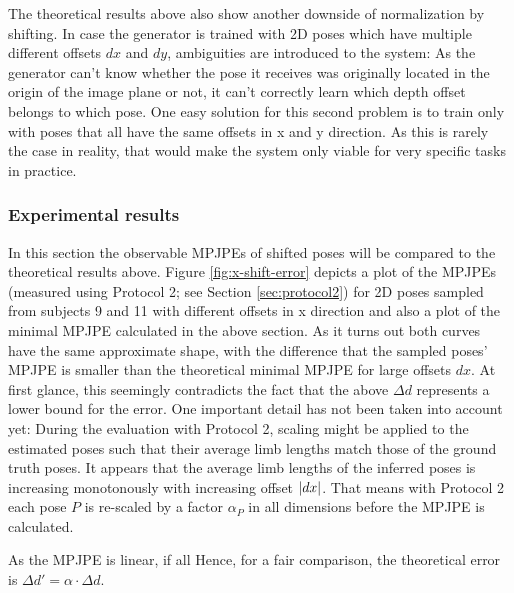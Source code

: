 The theoretical results above also show another downside of normalization by shifting.
In case the generator is trained with 2D poses which have multiple different offsets $dx$ and $dy$, ambiguities are introduced to the system:
As the generator can't know whether the pose it receives was originally located in the origin of the image plane or not, it can't correctly learn which depth offset belongs to which pose.
One easy solution for this second problem is to train only with poses that all have the same offsets in x and y direction.
As this is rarely the case in reality, that would make the system only viable for very specific tasks in practice.


\subsubsection{Experimental results}

In this section the observable MPJPEs of shifted poses will be compared to the theoretical results above. 
Figure \ref{fig:x-shift-error} depicts a plot of the MPJPEs (measured using Protocol 2; see Section \ref{sec:protocol2}) for 2D poses sampled from subjects 9 and 11 with different offsets in x direction and also a plot of the minimal MPJPE calculated in the above section.
As it turns out both curves have the same approximate shape, with the difference that the sampled poses' MPJPE is smaller than the theoretical minimal MPJPE for large offsets $dx$.
At first glance, this seemingly contradicts the fact that the above $\Delta d$ represents a lower bound for the error.
One important detail has not been taken into account yet:
During the evaluation with Protocol 2, scaling might be applied to the estimated poses such that their average limb lengths match those of the ground truth poses.
It appears that the average limb lengths of the inferred poses is increasing monotonously with increasing offset $\abs{dx}$.
That means with Protocol 2 each pose $P$ is re-scaled by a factor $\alpha_P$ in all dimensions before the MPJPE is calculated.

As the MPJPE is linear, if all 
Hence, for a fair comparison, the theoretical error is $\Delta d' = \alpha \cdot \Delta d$.

